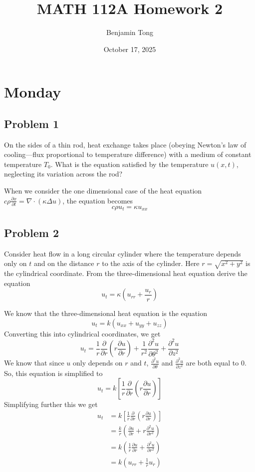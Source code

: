 \documentclass{ben}
\title{MATH 112A Homework 2}
\author{Benjamin Tong}
\date{October 17, 2025}
\begin{document}
\maketitle
\section{Monday}
\subsection{Problem 1}
On the sides of a thin rod, heat exchange takes place (obeying Newton's
law of cooling—flux proportional to temperature difference) with a medium of
constant temperature $T_0$. What is the equation satisfied by the temperature $u(x, t)$, neglecting
its variation across the rod?
\begin{solution}
    When we consider the one dimensional case of the heat equation
    $c \rho \frac{\partial x}{\partial t} = \nabla \cdot (\kappa \Delta u)$, the equation becomes
    \[
    c \rho u_t = \kappa u_{xx}
    \]
\end{solution}
\subsection{Problem 2}
Consider heat flow in a long circular cylinder where the temperature depends only on $t$
and on the distance $r$ to the axis of the cylinder. Here $r = \sqrt{x^2 + y^2}$ is the cylindrical
coordinate. From the three-dimensional heat equation derive the equation
\[
    u_t = \kappa \left( u_{rr} + \frac{u_r}{r} \right)
\]
\begin{solution}
    We know that the three-dimensional heat equation is the equation
    \[
        u_t = k(u_{xx} + u_{yy} + u_{zz})
    \]
    Converting this into cylindrical coordinates, we get
    \[
        u_t =
        \frac{1}{r} \frac{\partial }{\partial r} \left( r \frac{\partial u}{\partial r} \right)
        + \frac{1}{r^2} \frac{\partial^2 u}{\partial \theta^2} + \frac{\partial^2 u}{\partial z^2}
    \]
    We know that since $u$ only depends on $r$ and $t$,
    $\frac{\partial^2 u}{\partial \theta}$ and $\frac{\partial^2 u}{\partial z^2}$
    are both equal to $0$. So, this equation is simplified to
    \[
        u_t = k \left[ \frac{1}{r} \frac{\partial }{\partial r} \left( r \frac{\partial u}{\partial r} \right) \right]
    \]
    Simplifying further this we get
    \begin{align*}
        u_t &= k \left[ \frac{1}{r} \frac{\partial }{\partial r} \left( r \frac{\partial u}{\partial r} \right) \right]\\
        &= \frac{k}{r} \left( \frac{\partial u}{\partial r} + r \frac{\partial^2 u}{\partial r^2} \right)\\ 
        &= k \left( \frac{1}{r} \frac{\partial u}{\partial r} + \frac{\partial^2 u}{\partial r^2} \right)\\
        &= k \left( u_{rr} + \frac{1}{r} u_{r} \right)
    \end{align*}
\end{solution}
\end{document}
